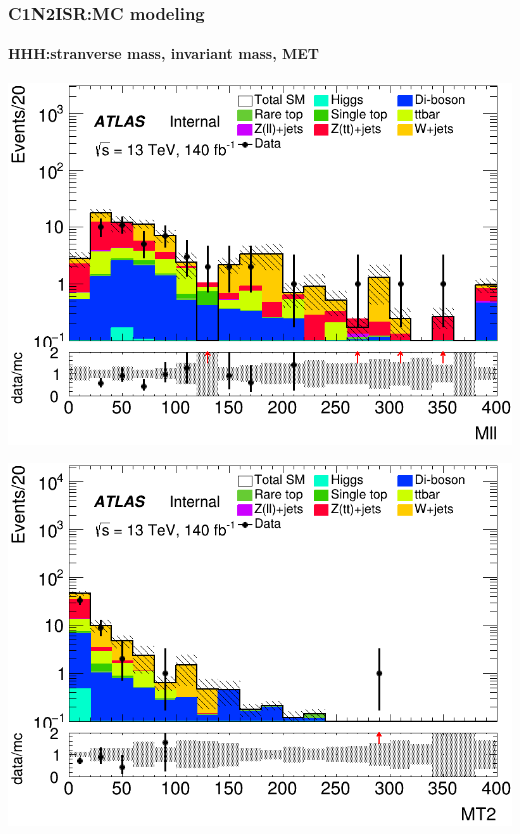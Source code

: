 \documentclass[usenames,dvipsnames]{beamer}
\begin{document}
\begin{frame}
\frametitle{C1N2ISR:MC modeling}
\framesubtitle{HHH:\quad stranverse mass, invariant mass, MET}
    \begin{minipage}{0.32\textwidth}
        \centering
        \includegraphics[width=\textwidth]{graphics/HHH_met/HHH_met_Mll.png}
    \end{minipage}
    \hfill
    \begin{minipage}{0.32\textwidth}
        \centering
        \includegraphics[width=\textwidth]{graphics/HHH_met/HHH_met_MT2.png}
    \end{minipage}
    \hfill
    

\end{frame}
\end{document}
